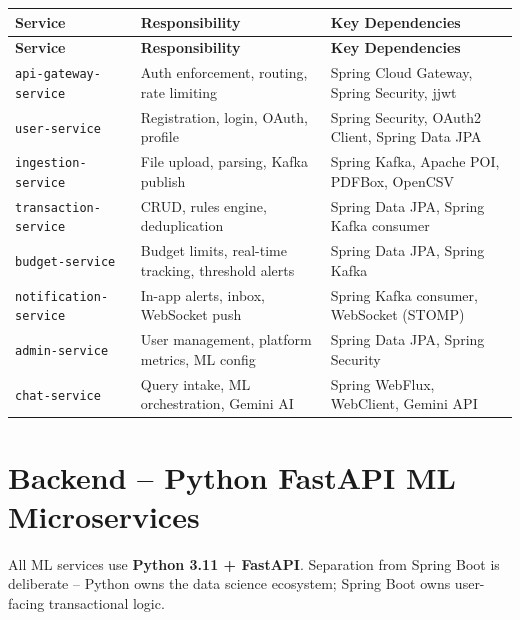 \documentclass[12pt,a4paper]{report}
\begin{document}
\begin{longtable}{p{3.8cm} p{5cm} p{5.2cm}}
\toprule
\textbf{Service} & \textbf{Responsibility} & \textbf{Key Dependencies} \\
\midrule
\endfirsthead
\toprule
\textbf{Service} & \textbf{Responsibility} & \textbf{Key Dependencies} \\
\midrule
\endhead
\bottomrule
\endlastfoot
\texttt{api-gateway-service} & Auth enforcement, routing, rate limiting & Spring Cloud Gateway, Spring Security, jjwt \\[3pt]
\texttt{user-service} & Registration, login, OAuth, profile & Spring Security, OAuth2 Client, Spring Data JPA \\[3pt]
\texttt{ingestion-service} & File upload, parsing, Kafka publish & Spring Kafka, Apache POI, PDFBox, OpenCSV \\[3pt]
\texttt{transaction-service} & CRUD, rules engine, deduplication & Spring Data JPA, Spring Kafka consumer \\[3pt]
\texttt{budget-service} & Budget limits, real-time tracking, threshold alerts & Spring Data JPA, Spring Kafka \\[3pt]
\texttt{notification-service} & In-app alerts, inbox, WebSocket push & Spring Kafka consumer, WebSocket (STOMP) \\[3pt]
\texttt{admin-service} & User management, platform metrics, ML config & Spring Data JPA, Spring Security \\[3pt]
\texttt{chat-service} & Query intake, ML orchestration, Gemini AI & Spring WebFlux, WebClient, Gemini API \\[3pt]
\end{longtable}

\section{Backend -- Python FastAPI ML Microservices}

All ML services use \textbf{Python 3.11 + FastAPI}. Separation from Spring Boot is deliberate -- Python owns the data science ecosystem; Spring Boot owns user-facing transactional logic.
\end{document}
